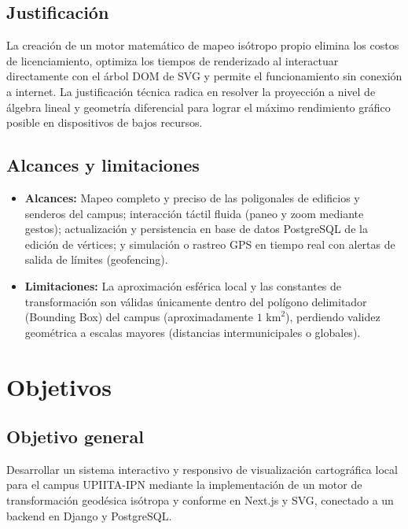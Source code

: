 \documentclass[12pt,a4paper]{article}
\begin{document}
\subsection{Justificación}
La creación de un motor matemático de mapeo isótropo propio elimina los costos de licenciamiento, optimiza los tiempos de renderizado al interactuar directamente con el árbol DOM de SVG y permite el funcionamiento sin conexión a internet. La justificación técnica radica en resolver la proyección a nivel de álgebra lineal y geometría diferencial para lograr el máximo rendimiento gráfico posible en dispositivos de bajos recursos.

\subsection{Alcances y limitaciones}
\begin{itemize}
    \item \textbf{Alcances:} Mapeo completo y preciso de las poligonales de edificios y senderos del campus; interacción táctil fluida (paneo y zoom mediante gestos); actualización y persistencia en base de datos PostgreSQL de la edición de vértices; y simulación o rastreo GPS en tiempo real con alertas de salida de límites (geofencing).
    \item \textbf{Limitaciones:} La aproximación esférica local y las constantes de transformación son válidas únicamente dentro del polígono delimitador (Bounding Box) del campus (aproximadamente $1\text{ km}^2$), perdiendo validez geométrica a escalas mayores (distancias intermunicipales o globales).
\end{itemize}

\section{Objetivos}

\subsection{Objetivo general}
Desarrollar un sistema interactivo y responsivo de visualización cartográfica local para el campus UPIITA-IPN mediante la implementación de un motor de transformación geodésica isótropa y conforme en Next.js y SVG, conectado a un backend en Django y PostgreSQL.
\end{document}
